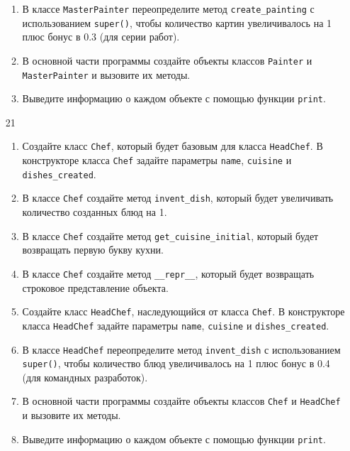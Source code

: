 \begin{enumerate}
\begin{enumerate}
    \item В классе \texttt{MasterPainter} переопределите метод \texttt{create\_painting} с использованием \texttt{super()}, чтобы количество картин увеличивалось на 1 плюс бонус в 0.3 (для серии работ).
    
    \item В основной части программы создайте объекты классов \texttt{Painter} и \texttt{MasterPainter} и вызовите их методы.
    
    \item Выведите информацию о каждом объекте с помощью функции \texttt{print}.
\end{enumerate}

\item[21] 
\begin{enumerate}
    \item Создайте класс \texttt{Chef}, который будет базовым для класса \texttt{HeadChef}. В конструкторе класса \texttt{Chef} задайте параметры \texttt{name}, \texttt{cuisine} и \texttt{dishes\_created}.
    
    \item В классе \texttt{Chef} создайте метод \texttt{invent\_dish}, который будет увеличивать количество созданных блюд на 1.
    
    \item В классе \texttt{Chef} создайте метод \texttt{get\_cuisine\_initial}, который будет возвращать первую букву кухни.
    
    \item В классе \texttt{Chef} создайте метод \texttt{\_\_repr\_\_}, который будет возвращать строковое представление объекта.
    
    \item Создайте класс \texttt{HeadChef}, наследующийся от класса \texttt{Chef}. В конструкторе класса \texttt{HeadChef} задайте параметры \texttt{name}, \texttt{cuisine} и \texttt{dishes\_created}.
    
    \item В классе \texttt{HeadChef} переопределите метод \texttt{invent\_dish} с использованием \texttt{super()}, чтобы количество блюд увеличивалось на 1 плюс бонус в 0.4 (для командных разработок).
    
    \item В основной части программы создайте объекты классов \texttt{Chef} и \texttt{HeadChef} и вызовите их методы.
    
    \item Выведите информацию о каждом объекте с помощью функции \texttt{print}.
\end{enumerate}


\end{enumerate}
